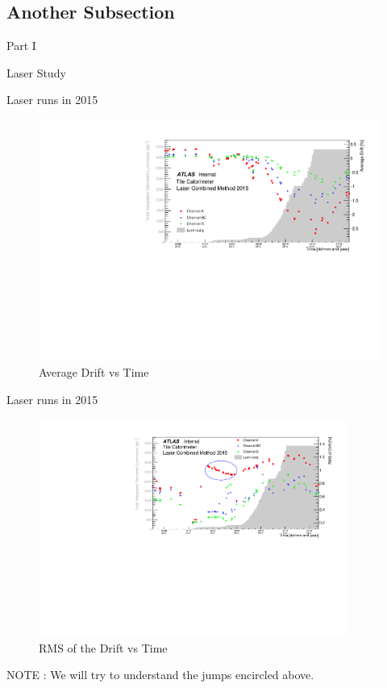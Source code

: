 \documentclass{beamer}
\begin{document}
\subsection{Another Subsection}
\begin{frame}{Part I}
\begin{center}\color{red}\Huge{Laser Study}\end{center}
\end{frame}
\begin{frame}{Laser runs in 2015}{}

\begin{figure}
\centering
\includegraphics[width=\textwidth]{drm15.pdf}
\caption{Average Drift vs Time}
\end{figure}
\end{frame}

\begin{frame}{Laser runs in 2015}{}
\begin{figure}
\centering
\includegraphics[width=0.9\textwidth]{drr151.pdf}
\caption{RMS of the Drift vs Time}
\end{figure}
NOTE : We will try to understand the jumps encircled above.
\end{frame}
\end{document}
